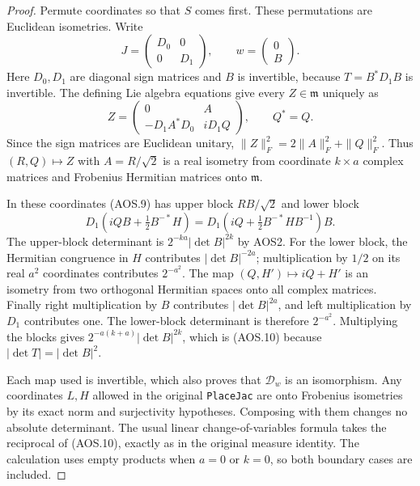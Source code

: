 \documentclass[11pt,a4paper]{article}
\numberwithin{equation}{section}
\theoremstyle{remark}\newtheorem{remark}[theorem]{Remark}
\begin{document}
\begin{proof}
Permute coordinates so that $S$ comes first.  These permutations are
Euclidean isometries.  Write
\[
       J=\begin{pmatrix}D_0&0\\0&D_1\end{pmatrix},
       \qquad w=\begin{pmatrix}0\\B\end{pmatrix}.
\]
Here $D_0,D_1$ are diagonal sign matrices and $B$ is invertible,
because $T=B^*D_1B$ is invertible.  The defining Lie algebra equations
give every $Z\in\mathfrak m$ uniquely as
\[
 Z=\begin{pmatrix}
       0&A\\-D_1A^*D_0&iD_1Q
    \end{pmatrix},\qquad Q^*=Q.
 \tag{AOS.11}
\]
Since the sign matrices are Euclidean unitary,
$\|Z\|_F^2=2\|A\|_F^2+\|Q\|_F^2$.
Thus $(R,Q)\mapsto Z$ with $A=R/\sqrt2$ is a real isometry
from coordinate $k\times a$ complex matrices and Frobenius Hermitian
matrices onto $\mathfrak m$.

In these coordinates (AOS.9) has upper block
$RB/\sqrt2$ and lower block
\[
       D_1\left(iQB+\tfrac12B^{-*}H\right)
       =D_1\left(iQ+\tfrac12B^{-*}HB^{-1}\right)B.
 \tag{AOS.12}
\]
The upper-block determinant is $2^{-ka}|\det B|^{2k}$ by AOS2.
For the lower block, the Hermitian congruence in $H$ contributes
$|\det B|^{-2a}$; multiplication by $1/2$ on its real $a^2$
coordinates contributes $2^{-a^2}$.  The map
$(Q,H')\mapsto iQ+H'$ is an isometry from two orthogonal Hermitian
spaces onto all complex matrices.  Finally right multiplication by
$B$ contributes $|\det B|^{2a}$, and left multiplication by $D_1$
contributes one.  The lower-block determinant is therefore
$2^{-a^2}$.  Multiplying the blocks gives
$2^{-a(k+a)}|\det B|^{2k}$, which is (AOS.10) because
$|\det T|=|\det B|^2$.

Each map used is invertible, which also proves that $\mathcal D_w$
is an isomorphism.  Any coordinates $L,H$ allowed in the original
\texttt{Place\allowbreak Jac} are onto Frobenius isometries by its exact norm and
surjectivity hypotheses.  Composing with them changes no absolute
determinant.  The usual linear change-of-variables formula takes the
reciprocal of (AOS.10), exactly as in the original measure identity.
The calculation uses empty products when $a=0$ or $k=0$, so both
boundary cases are included.
\end{proof}
\end{document}
